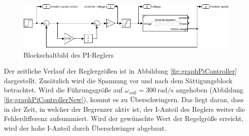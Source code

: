 \documentclass[
    paper=a4,
    fontsize=10pt,
    DIV=12,
    oneside,
]{scrartcl}
\begin{document}
    \begin{figure}[hbt]
        \centering
        \includegraphics[width=1.5\imagewidth]{../versuch3/blockPiController}
        \caption{Blockschaltbild des PI-Reglers}
        \label{fig:blockPiController}
    \end{figure}   

    Der zeitliche Verlauf der Reglergrößen ist in Abbildung \ref{fig:graphPiController} dargestellt. Zusätzlich wird die Spannung vor und nach dem Sättigungsblock betrachtet. Wird die Führungsgröße auf \(\omega_{soll} = \SI{300}{\radian\per\second}\) angehoben (Abbildung \ref{fig:graphPiControllerNew}), kommt es zu Überschwingern. Das liegt daran, dass in der Zeit, in welcher der Begrenzer aktiv ist, der I-Anteil des Reglers weiter die Fehlerdifferenz aufsummiert. Wird der gewünschte Wert der Regelgröße erreicht, wird der hohe I-Anteil durch Überschwinger abgebaut.
\end{document}
